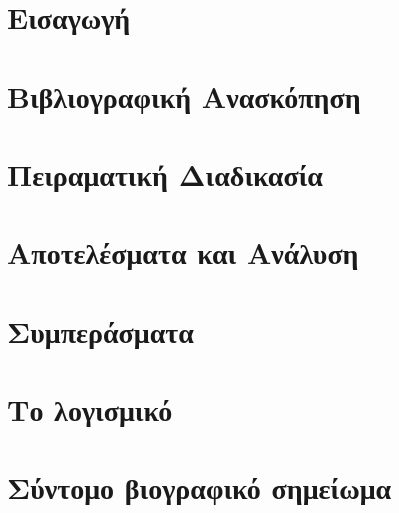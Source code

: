 \documentclass[12pt]{report}
\begin{document}











\tableofcontents



\chapter{Εισαγωγή}


\chapter{Βιβλιογραφική Ανασκόπηση}


\chapter{Πειραματική Διαδικασία}


\chapter{Αποτελέσματα και Ανάλυση}


\chapter{Συμπεράσματα}




\appendix
\chapter{Το λογισμικό}

\chapter{Σύντομο βιογραφικό σημείωμα}

\end{document}
